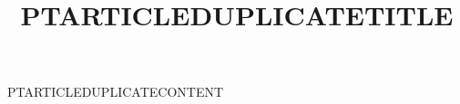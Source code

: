 \documentclass[nominted]{pt-article}
\title{PTARTICLEDUPLICATETITLE}
\begin{document}
\maketitle
\noindent PTARTICLEDUPLICATECONTENT
\end{document}
